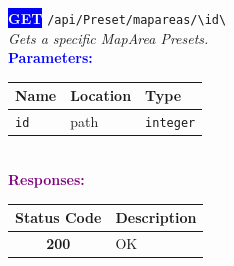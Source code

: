 \begin{tcolorbox}[
    colback=blue!5,
    colframe=blue,
    arc=2mm,
    boxrule=1pt,
    left=5pt,
    right=5pt,
    top=5pt,
    bottom=5pt
]
\noindent\colorbox{blue}{\textcolor{white}{\textbf{GET}}} 
\texttt{\large /api/Preset/mapareas/\textbackslash{}{id\textbackslash{}}}\\[0.3em]
\textit{Gets a specific MapArea Presets.}\\[0.3em]
\vspace{0.3em}
\textbf{\textcolor{blue}{Parameters:}}\\[0.2em]
\begin{tabular}{|l|l|l|}
\hline
\rowcolor{gray!20}
\textbf{Name} & \textbf{Location} & \textbf{Type} \\ \hline
\texttt{id} & path & \texttt{integer} \\ \hline
\end{tabular}\\[0.5em]
\vspace{0.3em}
\textbf{\textcolor{purple}{Responses:}}\\[0.2em]
\begin{tabular}{|c|p{10cm}|}
\hline
\rowcolor{gray!20}
\textbf{Status Code} & \textbf{Description} \\ \hline
\colorbox{green!20}{\textbf{200}} & OK \\ \hline
\end{tabular}
\end{tcolorbox}
\vspace{0.5em}

